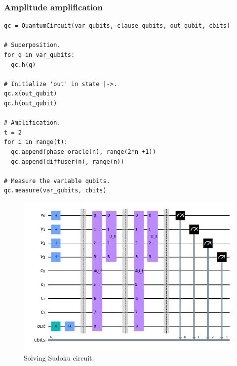 \documentclass{article}
\begin{document}
\subsubsection{Amplitude amplification}
\begin{verbatim}
qc = QuantumCircuit(var_qubits, clause_qubits, out_qubit, cbits)

# Superposition.
for q in var_qubits:
  qc.h(q)

# Initialize 'out' in state |->.
qc.x(out_qubit)
qc.h(out_qubit)

# Amplification.
t = 2
for i in range(t):
  qc.append(phase_oracle(n), range(2*n +1))
  qc.append(diffuser(n), range(n))

# Measure the variable qubits.
qc.measure(var_qubits, cbits)
\end{verbatim}
\begin{figure}[H]
  \centering
  \includegraphics[width=320pt]{Img/circuit.png}
  \caption{Solving Sudoku circuit.}
\end{figure}
\end{document}
